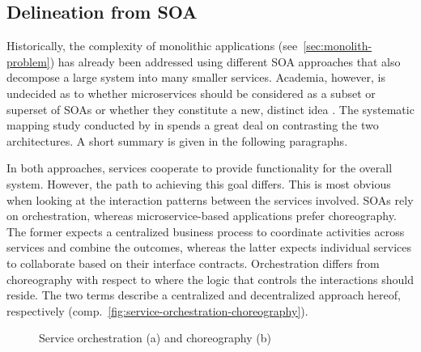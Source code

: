 \subsection{Delineation from \acl{SOA}}
\label{sec:soa-microservice-comparison}

Historically, the complexity of monolithic applications (see~\autoref{sec:monolith-problem}) has already been addressed using different \acf{SOA} approaches that also decompose a large system into many smaller services. Academia, however, is undecided as to whether microservices should be considered as a subset or superset of \acp{SOA} or whether they constitute a new, distinct idea \cite[pp.~584--585]{villamizar2015evaluating} \cite[p.~30]{cerny2018contextual}. The systematic mapping study conducted by \citeauthor{cerny2018contextual} in \cite{cerny2018contextual} spends a great deal on contrasting the two architectures. A short summary is given in the following paragraphs.

In both approaches, services cooperate to provide functionality for the overall system. However, the path to achieving this goal differs. This is most obvious when looking at the interaction patterns between the services involved. \acp{SOA} rely on orchestration, whereas microservice-based applications prefer choreography. The former expects a centralized business process to coordinate activities across services and combine the outcomes, whereas the latter expects individual services to collaborate based on their interface contracts. Orchestration differs from choreography with respect to where the logic that controls the interactions should reside. The two terms describe a centralized and decentralized approach hereof, respectively (comp.~\autoref{fig:service-orchestration-choreography}).

\begin{figure}[htp]
    \centering
    \qquad

    \caption[Service orchestration and choreography]{Service orchestration (a) and choreography (b) \cite[p.~30]{cerny2018contextual}}
    \label{fig:service-orchestration-choreography}
\end{figure}

\FloatBarrier

